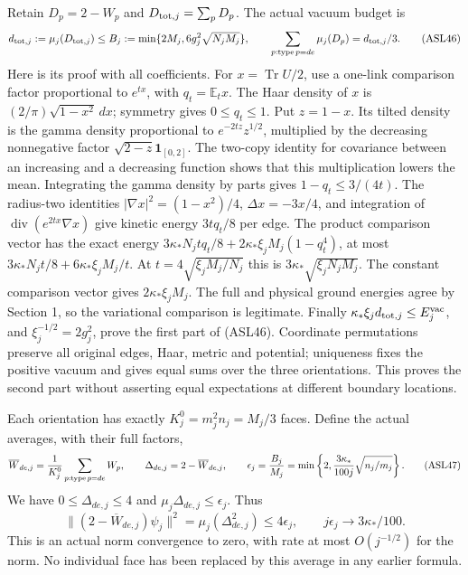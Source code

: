 \documentclass[11pt]{article}
\begin{document}
Retain \(D_p=2-W_p\) and \(D_{{\rm tot},j}=\sum_pD_p\). The actual vacuum budget is
\[
 d_{{\rm tot},j}:=\mu_j(D_{{\rm tot},j})\le
 B_j:=\min\{2M_j,6g_j^2\sqrt{N_jM_j}\},\qquad
 \sum_{p:\operatorname{type}p=de}\mu_j(D_p)=d_{{\rm tot},j}/3.
 \tag{ASL46}
\]
Here is its proof with all coefficients. For \(x=\operatorname{Tr}U/2\), use a one-link comparison factor proportional to \(e^{tx}\), with \(q_t=\mathbb E_t x\). The Haar density of \(x\) is \((2/\pi)\sqrt{1-x^2}\,dx\); symmetry gives \(0\le q_t\le1\). Put \(z=1-x\). Its tilted density is the gamma density proportional to \(e^{-2tz}z^{1/2}\), multiplied by the decreasing nonnegative factor \(\sqrt{2-z}\mathbf1_{[0,2]}\). The two-copy identity for covariance between an increasing and a decreasing function shows that this multiplication lowers the mean. Integrating the gamma density by parts gives \(1-q_t\le3/(4t)\). The radius-two identities \(|\nabla x|^2=(1-x^2)/4\), \(\Delta x=-3x/4\), and integration of \(\operatorname{div}(e^{2tx}\nabla x)\) give kinetic energy \(3tq_t/8\) per edge. The product comparison vector has the exact energy
\(3\kappa_*N_jtq_t/8+2\kappa_*\xi_jM_j(1-q_t^4)\), at most \(3\kappa_*N_jt/8+6\kappa_*\xi_jM_j/t\). At \(t=4\sqrt{\xi_jM_j/N_j}\) this is \(3\kappa_*\sqrt{\xi_jN_jM_j}\). The constant comparison vector gives \(2\kappa_*\xi_jM_j\). The full and physical ground energies agree by Section 1, so the variational comparison is legitimate. Finally \(\kappa_*\xi_jd_{{\rm tot},j}\le E_j^{\rm vac}\), and \(\xi_j^{-1/2}=2g_j^2\), prove the first part of (ASL46). Coordinate permutations preserve all original edges, Haar, metric and potential; uniqueness fixes the positive vacuum and gives equal sums over the three orientations. This proves the second part without asserting equal expectations at different boundary locations.

Each orientation has exactly \(K_j^0=m_j^2n_j=M_j/3\) faces. Define the actual averages, with their full factors,
\[
 \overline W_{de,j}={1\over K_j^0}\sum_{p:\operatorname{type}p=de}W_p,
 \qquad \Delta_{de,j}=2-\overline W_{de,j},\qquad
 \epsilon_j={B_j\over M_j}
 =\min\left\{2,{3\kappa_*\over100j}\sqrt{n_j/m_j}\right\}.
 \tag{ASL47}
\]
We have \(0\le\Delta_{de,j}\le4\) and \(\mu_j\Delta_{de,j}\le\epsilon_j\). Thus
\[
 \|(2-\overline W_{de,j})\psi_j\|^2
 =\mu_j(\Delta_{de,j}^2)\le4\epsilon_j,
 \qquad j\epsilon_j\longrightarrow3\kappa_*/100.
 \tag{ASL48}
\]
This is an actual norm convergence to zero, with rate at most \(O(j^{-1/2})\) for the norm. No individual face has been replaced by this average in any earlier formula.
\end{document}
